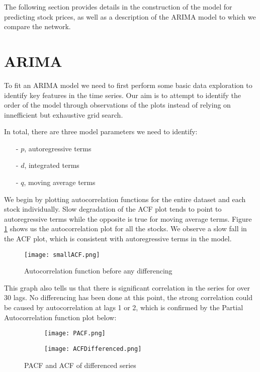 \graphicspath{{./figures/}}

The following section provides details in the construction of the model for predicting stock prices, as well as a description of the ARIMA model to which we compare the network.

\section{ARIMA}
To fit an ARIMA model we need to first perform some basic data exploration to identify key features in the time series. Our aim is to attempt to identify the order of the model through observations of the plots instead of relying on innefficient but exhaustive grid search. 

In total, there are three model parameters we need to identify:
\begin{itemize}[nosep]
    \item[-] $p$, autoregressive terms
    \item[-] $d$, integrated terms
    \item[-] $q$, moving average terms
\end{itemize}%

We begin by plotting autocorrelation functions for the entire dataset and each stock individually. Slow degradation of the ACF plot tends to point to autoregressive terms while the opposite is true for moving average terms. Figure \ref{tab:smallACF} shows us the autocorrelation plot for all the stocks. We observe a slow fall in the ACF plot, which is consistent with autoregressive terms in the model.

\begin{figure}[H]
    \centering
    \texttt{[image: smallACF.png]}
    \caption{Autocorrelation function before any differencing}
    \label{tab:smallACF}    
\end{figure}

This graph also tells us that there is significant correlation in the series for over 30 lags. No differencing has been done at this point, the strong correlation could be caused by autocorrelation at lags 1 or 2, which is confirmed by the Partial Autocorrelation function plot below:

\begin{figure}[H]
    \centering
    \begin{subfigure}{.5\textwidth}
        \centering
        \texttt{[image: PACF.png]}
        \label{tab:PACF}        
    \end{subfigure}%
    \begin{subfigure}{.5\textwidth}
        \centering
        \texttt{[image: ACFDifferenced.png]}
        \label{tab:differenced}
    \end{subfigure}
    \caption{PACF and ACF of differenced series}
\end{figure}

